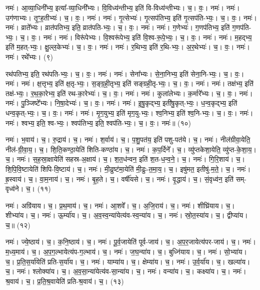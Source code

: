 नमः॑। आ॒व्या॒धिनी᳚भ्य॒ इत्या᳚-व्या॒धिनी᳚भ्यः। वि॒विध्य॑न्तीभ्य॒ इति॑ वि-विध्य॑न्तीभ्यः। च॒। वः॒। नमः॑। नमः॑। उग॑णाभ्यः। तृ॒ꣳ॒ह॒तीभ्यः॑। च॒। वः॒। नमः॑। 
नमः॑। गृ॒त्सेभ्यः॑। गृ॒त्सप॑तिभ्य॒ इति॑ गृ॒त्सप॑ति-भ्यः॒। च॒। वः॒। नमः॑। 
नमः॑। व्राते᳚भ्यः। व्रात॑पतिभ्य॒ इति॒ व्रात॑पति-भ्यः॒। च॒। वः॒। नमः॑। 
नमः॑। ग॒णेभ्यः॑। ग॒णप॑तिभ्य॒ इति॑ ग॒णप॑ति-भ्यः॒। च॒। वः॒। नमः॑। 
नमः॑। विरू॑पेभ्यः। वि॒श्वरू॑पेभ्य॒ इति॑ वि॒श्व-रू॒पे॒भ्यः॒। च॒। वः॒। नमः॑। 
नमः॑। म॒हद्भ्य॒ इति॑ म॒हत्-भ्यः॒। क्षु॒ल्ल॒केभ्यः॑। च॒। वः॒। नमः॑। 
नमः॑। र॒थिभ्य॒ इति॑ र॒थि-भ्यः॒। अ॒र॒थेभ्यः॑। च॒। वः॒। नमः॑। 
नमः॑। रथे᳚भ्यः। (९)


रथ॑पतिभ्य॒ इति॒ रथ॑पति-भ्यः॒। च॒। वः॒। नमः॑। 
नमः॑। सेना᳚भ्यः। से॒ना॒निभ्य॒ इति॑ सेना॒नि-भ्यः॒। च॒। वः॒। नमः॑। 
नमः॑। क्ष॒त्तृभ्य॒ इति॑ क्ष॒तृ-भ्यः॒। स॒ङ्ग्र॒ही॒तृभ्य॒ इति॑ सङ्ग्रही॒तृ-भ्यः॒। च॒। वः॒। नमः॑। 
नमः॑। तक्ष॑भ्य॒ इति॑ तक्ष॑-भ्यः॒। र॒थ॒का॒रेभ्य॒ इति॑ रथ-का॒रेभ्यः॑। च॒। वः॒। नमः॑। 
नमः॑। कुला॑लेभ्यः। क॒र्मारे᳚भ्यः। च॒। वः॒। नमः॑। 
नमः॑। पु॒ञ्जिष्टे᳚भ्यः। नि॒षा॒देभ्यः॑। च॒। वः॒। नमः॑। 
नमः॑। इ॒षु॒कृद्भ्य॒ इती॑षु॒कृत्-भ्यः॒। ध॒न्व॒कृद्भ्य॒ इति॑ धन्व॒कृत्-भ्यः॒। च॒। वः॒। नमः॑। 
नमः॑। मृ॒ग॒युभ्य॒ इति॑ मृग॒यु-भ्यः॒। श्व॒निभ्य॒ इति॑ श्व॒नि-भ्यः॒। च॒। वः॒। नमः॑। 
नमः॑। श्वभ्य॒ इति॒ श्व-भ्यः॒। श्वप॑तिभ्य॒ इति॒ श्वप॑ति-भ्यः॒। च॒। वः॒। नमः॑॥ (१०)


नमः॑। भ॒वाय॑। च॒। रु॒द्राय॑। च॒। 
नमः॑। श॒र्वाय॑। च॒। प॒शु॒पत॑य॒ इति॑ पशु-पत॑ये। च॒। 
नमः॑। नील॑ग्रीवा॒येति॒ नील॑-ग्री॒वा॒य॒। च॒। शि॒ति॒कण्ठा॒येति॑ शिति-कण्ठा॑य। च॒। 
नमः॑। क॒प॒र्दिने᳚। च॒। व्यु॑प्तकेशा॒येति॒ व्यु॑प्त-के॒शा॒य॒। च॒। 
नमः॑। स॒ह॒स्रा॒क्षायेति॑ सहस्र-अ॒क्षाय॑। च॒। श॒त॒ध॑न्वन॒ इति॑ श॒त-ध॒न्व॒ने॒। च॒। 
नमः॑। गि॒रि॒शाय॑। च॒। शि॒पि॒वि॒ष्टायेति॑ शिपि-वि॒ष्टाय॑। च॒। 
नमः॑। मी॒ढुष्ट॑मा॒येति॑ मी॒ढुः-त॒मा॒य॒। च॒। इषु॑मत॒ इतीषु॑-म॒ते॒। च॒। 
नमः॑। ह्र॒स्वाय॑। च॒। वा॒म॒नाय॑। च॒। 
नमः॑। बृ॒ह॒ते। च॒। वर्षी॑यसे। च॒। 
नमः॑। वृ॒द्धाय॑। च॒। सं॒वृध्व॑न॒ इति॑ सम्-वृध्व॑ने। च॒। (११)


नमः॑। अग्रि॑याय। च॒। प्र॒थ॒माय॑। च॒। 
नमः॑। आ॒शवे᳚। च॒। अ॒जि॒राय॑। च॒। 
नमः॑। शीघ्रि॑याय। च॒। शीभ्या॑य। च॒। 
नमः॑। ऊ॒र्म्या॑य। च॒। अ॒व॒स्व॒न्या॑येत्य॑व-स्व॒न्या॑य। च॒। 
नमः॑। स्रो॒त॒स्या॑य। च॒। द्वीप्या॑य। च॒॥ (१२)


नमः॑। ज्ये॒ष्ठाय॑। च॒। क॒नि॒ष्ठाय॑। च॒। 
नमः॑। पू॒र्व॒जायेति॑ पूर्व-जाय॑। च॒। अ॒प॒र॒जायेत्य॑पर-जाय॑। च॒। 
नमः॑। म॒ध्य॒माय॑। च॒। अ॒प॒ग॒ल्भायेत्य॑प-ग॒ल्भाय॑। च॒। 
नमः॑। ज॒घ॒न्या॑य। च॒। बुध्नि॑याय। च॒। 
नमः॑। सो॒भ्या॑य। च॒। प्र॒ति॒स॒र्या॑येति॑ प्रति-स॒र्या॑य। च॒। 
नमः॑। याम्या॑य। च॒। क्षेम्या॑य। च॒। 
नमः॑। उ॒र्व॒र्या॑य। च॒। खल्या॑य। च॒। 
नमः॑। श्लोक्या॑य। च॒। अ॒व॒सा॒न्या॑येत्य॑व-सा॒न्या॑य। च॒। 
नमः॑। वन्या॑य। च॒। कक्ष्या॑य। च॒। 
नमः॑। श्र॒वाय॑। च॒। प्र॒ति॒श्र॒वायेति॑ प्रति-श्र॒वाय॑। च॒। (१३)


